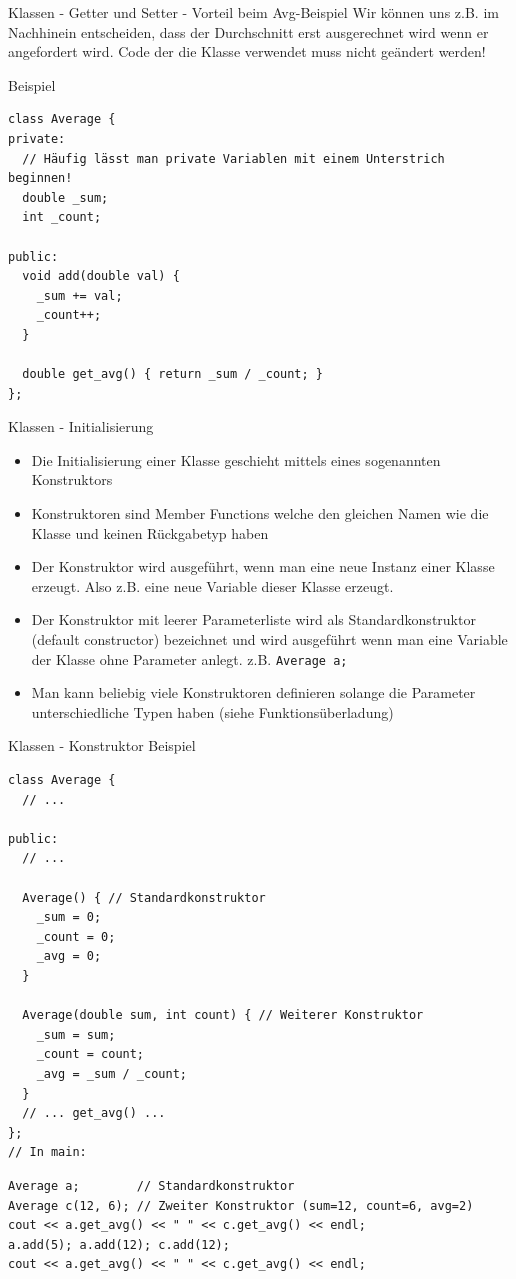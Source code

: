 \documentclass[presentation]{beamer}
\begin{document}
\begin{frame}[fragile,label={sec:orga126b83}]{Klassen - Getter und Setter - Vorteil beim Avg-Beispiel}
 Wir können uns z.B. im \alert{Nachhinein entscheiden}, dass der Durchschnitt
erst ausgerechnet wird wenn er angefordert wird. \alert{Code der die Klasse
verwendet muss nicht geändert werden!}
\begin{exampleblock}{Beispiel}
\begin{verbatim}
class Average {
private:
  // Häufig lässt man private Variablen mit einem Unterstrich beginnen!
  double _sum;
  int _count;

public:
  void add(double val) {
    _sum += val;
    _count++;
  }

  double get_avg() { return _sum / _count; }
};
\end{verbatim}
\end{exampleblock}
\end{frame}
\begin{frame}[fragile,label={sec:org7fa9fa8}]{Klassen - Initialisierung}
 \begin{itemize}
\item Die Initialisierung einer Klasse geschieht mittels eines sogenannten
\alert{Konstruktors}
\item Konstruktoren sind Member Functions welche den \alert{gleichen Namen wie
die Klasse} und \alert{keinen Rückgabetyp} haben
\item Der Konstruktor wird ausgeführt, wenn man eine neue Instanz einer
Klasse erzeugt. Also z.B. eine neue Variable dieser Klasse erzeugt.
\item Der Konstruktor mit \alert{leerer Parameterliste} wird als
\alert{Standardkonstruktor} (default constructor) bezeichnet und wird
ausgeführt wenn man eine Variable der Klasse ohne Parameter anlegt.
z.B. {\color{solarizedYellow}\texttt{Average a;}}
\item Man kann \alert{beliebig viele Konstruktoren} definieren solange die
Parameter unterschiedliche Typen haben (siehe \alert{Funktionsüberladung})
\end{itemize}
\end{frame}
\begin{frame}[fragile,label={sec:org388e3f3}]{Klassen - Konstruktor Beispiel}
 \begin{verbatim}
class Average {
  // ...

public:
  // ...

  Average() { // Standardkonstruktor
    _sum = 0;
    _count = 0;
    _avg = 0;
  }

  Average(double sum, int count) { // Weiterer Konstruktor
    _sum = sum;
    _count = count;
    _avg = _sum / _count;
  }
  // ... get_avg() ...
};
// In main:
\end{verbatim}
\begin{verbatim}
Average a;        // Standardkonstruktor
Average c(12, 6); // Zweiter Konstruktor (sum=12, count=6, avg=2)
cout << a.get_avg() << " " << c.get_avg() << endl;
a.add(5); a.add(12); c.add(12); 
cout << a.get_avg() << " " << c.get_avg() << endl;
\end{verbatim}
\end{frame}
\end{document}
